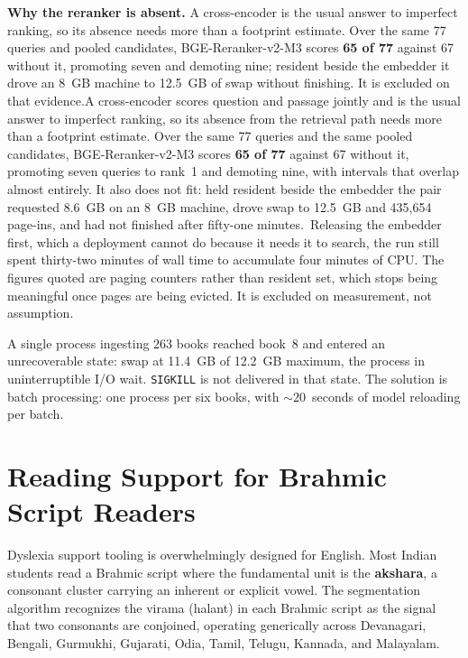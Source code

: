 \textbf{Why the reranker is absent.} \ifshort A cross-encoder is the usual answer to imperfect ranking, so its absence needs more than a footprint estimate. Over the same 77 queries and pooled candidates, BGE-Reranker-v2-M3 scores \textbf{65 of 77} against 67 without it, promoting seven and demoting nine; resident beside the embedder it drove an 8~GB machine to 12.5~GB of swap without finishing. It is excluded on that evidence.\else A cross-encoder scores question and passage jointly and is the usual answer to imperfect ranking, so its absence from the retrieval path needs more than a footprint estimate. Over the same 77 queries and the same pooled candidates, BGE-Reranker-v2-M3 scores \textbf{65 of 77} against 67 without it, promoting seven queries to rank~1 and demoting nine, with intervals that overlap almost entirely. It also does not fit: held resident beside the embedder the pair requested 8.6~GB on an 8~GB machine, drove swap to 12.5~GB and 435{,}654 page-ins, and had not finished after fifty-one minutes.\ifconf\else\ Releasing the embedder first, which a deployment cannot do because it needs it to search, the run still spent thirty-two minutes of wall time to accumulate four minutes of CPU. The figures quoted are paging counters rather than resident set, which stops being meaningful once pages are being evicted.\fi{} It is excluded on measurement, not assumption.\fi

\ifconf\else  %
A single process ingesting 263 books reached book~8 and entered an unrecoverable state: swap at 11.4~GB of 12.2~GB maximum, the process in uninterruptible I/O wait. \texttt{SIGKILL} is not delivered in that state. The solution is batch processing: one process per six books, with ${\sim}20$~seconds of model reloading per batch.
\fi

\ifconf\else  %
\section{Reading Support for Brahmic Script Readers}
\label{sec:accessibility}

Dyslexia support tooling is overwhelmingly designed for English. Most Indian students read a Brahmic script where the fundamental unit is the \textbf{akshara}, a consonant cluster carrying an inherent or explicit vowel. The segmentation algorithm recognizes the virama (halant) in each Brahmic script as the signal that two consonants are conjoined, operating generically across Devanagari, Bengali, Gurmukhi, Gujarati, Odia, Tamil, Telugu, Kannada, and Malayalam.

